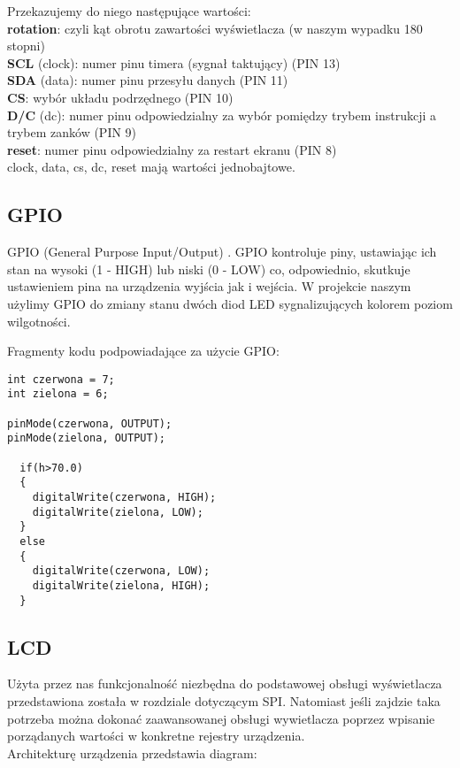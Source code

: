\documentclass{classrep}
\begin{document}
Przekazujemy do niego następujące wartości:\\
\textbf{rotation}: czyli kąt obrotu zawartości wyświetlacza (w naszym wypadku 180 stopni)\\
\textbf{SCL} (clock): numer pinu timera (sygnał taktujący) (PIN 13)\\
\textbf{SDA} (data): numer pinu przesyłu danych (PIN 11)\\
\textbf{CS}: wybór układu podrzędnego (PIN 10)\\
\textbf{D/C} (dc): numer pinu odpowiedzialny za wybór pomiędzy trybem instrukcji a trybem zanków (PIN 9)\\
\textbf{reset}: numer pinu odpowiedzialny za restart ekranu (PIN 8)\\

clock, data, cs, dc, reset mają wartości jednobajtowe.\\
\subsection {GPIO}
GPIO (General Purpose Input/Output) . GPIO kontroluje piny, ustawiając ich stan na wysoki (1 - HIGH) lub
niski (0 - LOW) co, odpowiednio, skutkuje ustawieniem pina na urządzenia wyjścia jak i wejścia.
W projekcie naszym użylimy GPIO do zmiany stanu dwóch diod LED sygnalizujących kolorem poziom wilgotności. 

Fragmenty kodu podpowiadające za użycie GPIO:
\begin{lstlisting}
int czerwona = 7;
int zielona = 6;

pinMode(czerwona, OUTPUT);
pinMode(zielona, OUTPUT);

  if(h>70.0)
  {
    digitalWrite(czerwona, HIGH);
    digitalWrite(zielona, LOW);
  }
  else
  {
    digitalWrite(czerwona, LOW);
    digitalWrite(zielona, HIGH);
  }
\end{lstlisting}

\subsection {LCD}
Użyta przez nas funkcjonalność niezbędna do podstawowej obsługi wyświetlacza przedstawiona została w rozdziale dotyczącym SPI. Natomiast jeśli zajdzie taka potrzeba można dokonać zaawansowanej obsługi wywietlacza poprzez wpisanie porządanych wartości w konkretne rejestry urządzenia. \\

Architekturę urządzenia przedstawia diagram:\\
\end{document}
